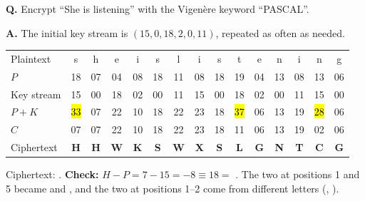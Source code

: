 \begin{worked}
\textbf{Q.} Encrypt ``She is listening'' with the Vigen\`ere keyword ``PASCAL''.

\textbf{A.} The initial key stream is $(15, 0, 18, 2, 0, 11)$, repeated as often as needed.
\begin{center}\small\setlength{\tabcolsep}{3.6pt}
\begin{tabular}{@{}l*{14}{c}@{}}
\toprule
Plaintext & s&h&e&i&s&l&i&s&t&e&n&i&n&g\\
$P$ & 18&07&04&08&18&11&08&18&19&04&13&08&13&06\\
Key stream & 15&00&18&02&00&11&15&00&18&02&00&11&15&00\\
$P + K$ & \hl{33}&07&22&10&18&22&23&18&\hl{37}&06&13&19&\hl{28}&06\\
$C$ & 07&07&22&10&18&22&23&18&11&06&13&19&02&06\\
Ciphertext & \textbf{H}&\textbf{H}&\textbf{W}&\textbf{K}&\textbf{S}&\textbf{W}&\textbf{X}&\textbf{S}&\textbf{L}&\textbf{G}&\textbf{N}&\textbf{T}&\textbf{C}&\textbf{G}\\
\bottomrule
\end{tabular}
\end{center}
Ciphertext: \textbf{}. \textbf{Check:} $H - P = 7 - 15 = -8 \equiv 18 =$ . The two  at positions 1 and 5 became  and , and the two  at positions 1--2 come from different letters (, ).
\end{worked}

